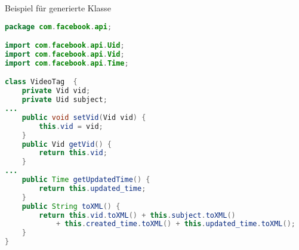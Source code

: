 \begin{frame}[fragile]{Beispiel für generierte Klasse}
    \begin{adjustbox}{height=0.4\textheight,keepaspectratio}
        \begin{lstlisting}[language=Java, label=lst:javaExample, caption=Beispiel für eine generierte Java-Datei (gekürzt)]
package com.facebook.api;

import com.facebook.api.Uid;
import com.facebook.api.Vid;
import com.facebook.api.Time;

class VideoTag  {
    private Vid vid;
    private Uid subject;
...
    public void setVid(Vid vid) {
        this.vid = vid;
    }
    public Vid getVid() {
        return this.vid;
    }
...
    public Time getUpdatedTime() {
        return this.updated_time;
    }
    public String toXML() {
        return this.vid.toXML() + this.subject.toXML()
            + this.created_time.toXML() + this.updated_time.toXML();
    }
}
        \end{lstlisting}
    \end{adjustbox}
\end{frame}